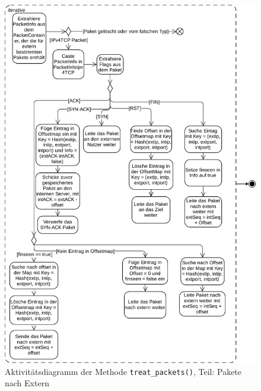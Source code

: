 \documentclass[../review_3.tex]{subfiles}
\begin{document}
\begin{figure}[h]
    \centering
    \includegraphics[width=0.96\linewidth]{img/treat_packets_1.pdf}
    \caption{Aktivitätsdiagramm der Methode \texttt{treat\_packets()}, Teil: Pakete nach Extern}
    \label{Aktivität_treat_packet_1}
\end{figure}
\end{document}
